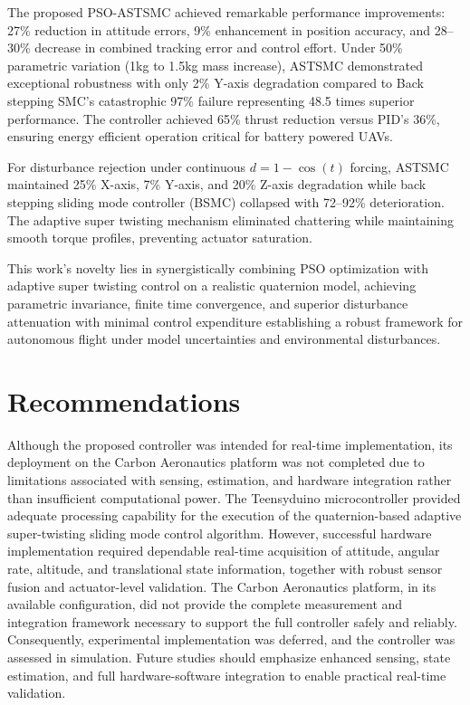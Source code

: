 The proposed PSO-ASTSMC achieved remarkable performance improvements: 27\% reduction in attitude errors, 9\% enhancement in position accuracy, and 28--30\% decrease in combined tracking error and control effort. Under 50\% parametric variation (1kg to 1.5kg mass increase), ASTSMC demonstrated exceptional robustness with only 2\% Y-axis degradation compared to Back stepping SMC's catastrophic 97\% failure representing 48.5 times superior performance. The controller achieved 65\% thrust reduction versus PID's 36\%, ensuring energy efficient operation critical for battery powered UAVs.

For disturbance rejection under continuous $d = 1 - \cos(t)$ forcing, ASTSMC maintained 25\% X-axis, 7\% Y-axis, and 20\% Z-axis degradation while back stepping sliding mode controller (BSMC) collapsed with 72--92\% deterioration. The adaptive super twisting mechanism eliminated chattering while maintaining smooth torque profiles, preventing actuator saturation.

This work's novelty lies in synergistically combining PSO optimization with adaptive super twisting control on a realistic quaternion model, achieving parametric invariance, finite time convergence, and superior disturbance attenuation with minimal control expenditure establishing a robust framework for autonomous flight under model uncertainties and environmental disturbances.

	\section{Recommendations}	

\noindent Although the proposed controller was intended for real-time implementation, its deployment on the Carbon Aeronautics platform was not completed due to limitations associated with sensing, estimation, and hardware integration rather than insufficient computational power. The Teensyduino microcontroller provided adequate processing capability for the execution of the quaternion-based adaptive super-twisting sliding mode control algorithm. However, successful hardware implementation required dependable real-time acquisition of attitude, angular rate, altitude, and translational state information, together with robust sensor fusion and actuator-level validation. The Carbon Aeronautics platform, in its available configuration, did not provide the complete measurement and integration framework necessary to support the full controller safely and reliably. Consequently, experimental implementation was deferred, and the controller was assessed in simulation. Future studies should emphasize enhanced sensing, state estimation, and full hardware-software integration to enable practical real-time validation.
    

